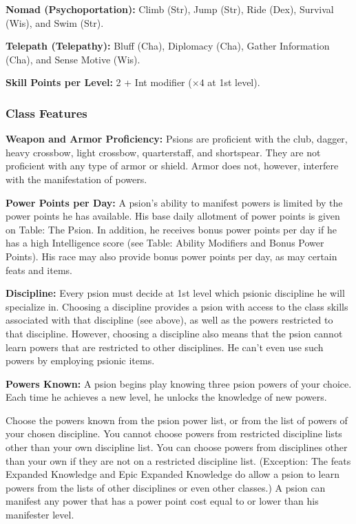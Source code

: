 \textbf{Nomad (Psychoportation):} Climb (Str), Jump (Str), Ride (Dex), Survival (Wis), and Swim (Str).

\textbf{Telepath (Telepathy):} Bluff (Cha), Diplomacy (Cha), Gather Information (Cha), and Sense Motive (Wis).

\textbf{Skill Points per Level:} 2 + Int modifier ($\times 4$ at 1st level).

\subsubsection{Class Features}

\textbf{Weapon and Armor Proficiency:} Psions are proficient with the club, dagger, heavy crossbow, light crossbow, quarterstaff, and shortspear. They are not proficient with any type of armor or shield. Armor does not, however, interfere with the manifestation of powers.

\textbf{Power Points per Day:} A psion's ability to manifest powers is limited by the power points he has available. His base daily allotment of power points is given on Table: The Psion. In addition, he receives bonus power points per day if he has a high Intelligence score (see Table: Ability Modifiers and Bonus Power Points). His race may also provide bonus power points per  day, as may certain feats and items.

\textbf{Discipline:} Every psion must decide at 1st level which psionic discipline he will specialize in. Choosing a discipline provides a psion with access to the class skills associated with that discipline (see above), as well as the powers restricted to that discipline. However, choosing a discipline also means that the psion cannot learn powers that are restricted to other disciplines. He can't even use such powers by employing psionic items.

\textbf{Powers Known:} A psion begins play knowing three psion powers of your choice. Each time he achieves a new level, he unlocks the knowledge of new powers.

Choose the powers known from the psion power list, or from the list of powers of your chosen discipline. You cannot choose powers from restricted discipline lists other than your own discipline list. You can choose powers from disciplines other than your own if they are not on a restricted discipline list. (Exception: The feats Expanded Knowledge and Epic Expanded Knowledge do allow a psion to learn powers from the lists of other disciplines or even other classes.) A psion can manifest any power that has a power point cost equal to or lower than his manifester level.


